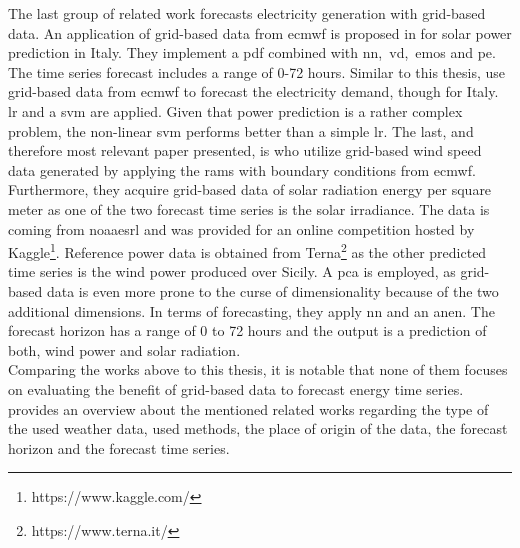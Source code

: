The last group of related work forecasts electricity generation with grid-based data. An application of grid-based data from \gls{ecmwf} is proposed in  for solar power prediction in Italy. They implement a \gls{pdf} combined with \gls{nn},~\gls{vd},~\gls{emos} and \gls{pe}. The time series forecast includes a range of 0-72 hours. Similar to this thesis,  use grid-based data from \gls{ecmwf} to forecast the electricity demand, though for Italy. \gls{lr} and a \gls{svm} are applied. Given that power prediction is a rather complex problem, the non-linear \gls{svm} performs better than a simple \gls{lr}. The last, and therefore most relevant paper presented, is  who utilize grid-based wind speed data generated by applying the \gls{rams} with boundary conditions from \gls{ecmwf}. Furthermore, they acquire grid-based data of solar radiation energy per square meter as one of the two forecast time series is the solar irradiance. The data is coming from \gls{noaaesrl} and was provided for an online competition hosted by Kaggle\footnote{https://www.kaggle.com/}. Reference power data is obtained from Terna\footnote{https://www.terna.it/} as the other predicted time series is the wind power produced over Sicily. A \gls{pca} is employed, as grid-based data is even more prone to the curse of dimensionality because of the two additional dimensions. In terms of forecasting, they apply \gls{nn} and an \gls{anen}. The forecast horizon has a range of 0 to 72 hours and the output is a prediction of both, wind power and solar radiation.\\

Comparing the works above to this thesis, it is notable that none of them focuses on evaluating the benefit of grid-based data to forecast energy time series.\\%

 provides an overview about the mentioned related works regarding the type of the used weather data, used methods, the place of origin of the data, the forecast horizon and the forecast time series.\\

